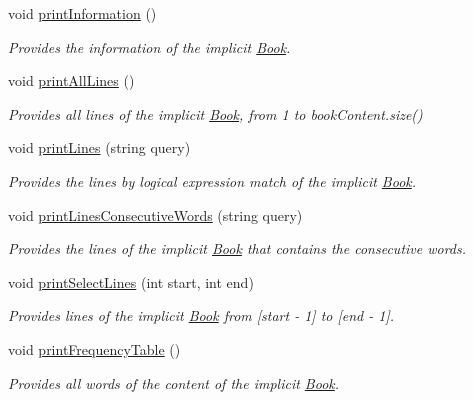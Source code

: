 \begin{DoxyCompactItemize}
void \hyperlink{class_book_a5b67f59017da9d2654c27fa27927a419}{print\+Information} ()
\begin{DoxyCompactList}\small\item\em Provides the information of the implicit \hyperlink{class_book}{Book}. \end{DoxyCompactList}\item 
void \hyperlink{class_book_a07076ae8fe5e924f18bf7527e0ba5092}{print\+All\+Lines} ()
\begin{DoxyCompactList}\small\item\em Provides all lines of the implicit \hyperlink{class_book}{Book}, from 1 to book\+Content.\+size() \end{DoxyCompactList}\item 
void \hyperlink{class_book_a0c019a8318999229bf506f7f64e67a85}{print\+Lines} (string query)
\begin{DoxyCompactList}\small\item\em Provides the lines by logical expression match of the implicit \hyperlink{class_book}{Book}. \end{DoxyCompactList}\item 
void \hyperlink{class_book_ad72be3b32007023b6bb41f12276e81a3}{print\+Lines\+Consecutive\+Words} (string query)
\begin{DoxyCompactList}\small\item\em Provides the lines of the implicit \hyperlink{class_book}{Book} that contains the consecutive words. \end{DoxyCompactList}\item 
void \hyperlink{class_book_a7193030998d6251851be26196762f8e6}{print\+Select\+Lines} (int start, int end)
\begin{DoxyCompactList}\small\item\em Provides lines of the implicit \hyperlink{class_book}{Book} from \mbox{[}start -\/ 1\mbox{]} to \mbox{[}end -\/ 1\mbox{]}. \end{DoxyCompactList}\item 
void \hyperlink{class_book_ac8b57c6a725ae9afeb24e6e74d4f8fd0}{print\+Frequency\+Table} ()
\begin{DoxyCompactList}\small\item\em Provides all words of the content of the implicit \hyperlink{class_book}{Book}. \end{DoxyCompactList}\end{DoxyCompactItemize}
